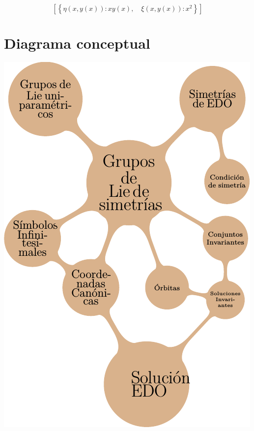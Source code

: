 \[\left [ \left \{ \eta{\left (x,y{\left (x \right )} \right )} : x y{\left (x \right )}, \quad \xi{\left (x,y{\left (x \right )} \right )} : x^{2}\right \}\right ]\]



\section{Diagrama conceptual}

\begin{center}
 \includegraphics[scale=.5]{imagenes/diagrama.png}
\end{center}


